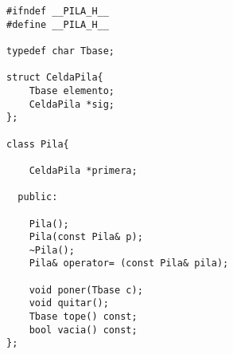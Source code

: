 \documentclass[11pt]{article}
\begin{document}
\begin{verbatim}
#ifndef __PILA_H__
#define __PILA_H__

typedef char Tbase;

struct CeldaPila{
    Tbase elemento;
    CeldaPila *sig;
};

class Pila{

    CeldaPila *primera;

  public:

    Pila();
    Pila(const Pila& p);
    ~Pila();
    Pila& operator= (const Pila& pila);

    void poner(Tbase c);
    void quitar();
    Tbase tope() const;
    bool vacia() const;
};
\end{verbatim}
\end{document}

